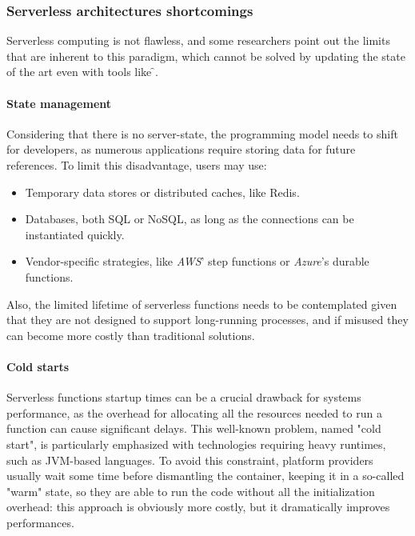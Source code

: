 \subsubsection{Serverless architectures shortcomings}

Serverless computing is not flawless, and some researchers \cite{two-steps-back}
point out the limits that are inherent to this paradigm, which cannot be solved
by updating the state of the art even with tools like \f{}.

\paragraph{\textbf{State management}} Considering that there is no server-state,
the programming model needs to shift for developers, as numerous applications require
storing data for future references.
To limit this disadvantage, users may use:
\begin{itemize}
  \item Temporary data stores or distributed caches, like Redis.
  \item Databases, both SQL or NoSQL, as long as the connections can be instantiated quickly.
  \item Vendor-specific strategies, like \textit{AWS}' step functions or \textit{Azure}'s durable functions.
\end{itemize}
Also, the limited lifetime of serverless functions needs to be contemplated given that
they are not designed to support long-running processes,
and if misused they can become more costly than traditional solutions.

\paragraph{\textbf{Cold starts}} Serverless functions startup times
can be a crucial drawback for systems performance, as the overhead for
allocating all the resources needed to run a function can cause significant
delays. This well-known problem, named "cold start", is
particularly emphasized with technologies requiring heavy runtimes, such as JVM-based languages.
To avoid this constraint, platform providers usually wait some time
before dismantling the container, keeping it in a so-called "warm" state,
so they are able to run the code without all the initialization overhead:
this approach is obviously more costly, but it dramatically improves performances.

